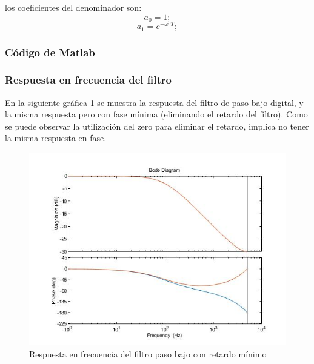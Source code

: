 \documentclass[titlepage]{article}
\begin{document}
los coeficientes del denominador son:
	\begin{equation}
		a_0=1;
	\end{equation}
	\begin{equation}
		a_1=e^{-\omega_oT};
	\end{equation}
	
\subsubsection{Código de Matlab}

\subsubsection{Respuesta en frecuencia del filtro}
En la siguiente gráfica \ref{fig:filtro_paso_bajo_minimo_retardo} se muestra la respuesta del filtro de paso bajo digital, y la misma respuesta pero con fase mínima (eliminando el retardo del filtro). Como se puede observar la utilización del zero para eliminar el retardo, implica no tener la misma respuesta en fase.
\begin{figure}[H]
  \centering
	\includegraphics[scale=0.5]{filtro_paso_bajo_minimo_retardo}
  \caption{Respuesta en frecuencia del filtro paso bajo con retardo mínimo}
  \label{fig:filtro_paso_bajo_minimo_retardo}
\end{figure}
\end{document}
